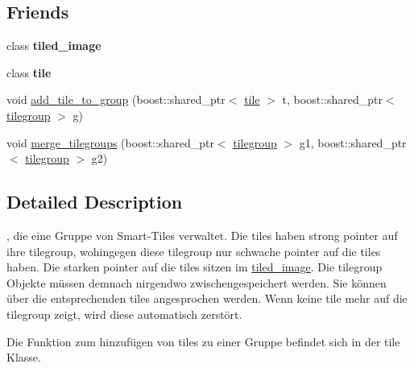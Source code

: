 \subsection*{Friends}
\begin{DoxyCompactItemize}
\item 
\hypertarget{classtilegroup_a82299213a6cc9d5d3fcbdaeb80060be7}{class {\bfseries tiled\-\_\-image}}\label{classtilegroup_a82299213a6cc9d5d3fcbdaeb80060be7}

\item 
\hypertarget{classtilegroup_afc864a305a7251d274bdf2ca681496e4}{class {\bfseries tile}}\label{classtilegroup_afc864a305a7251d274bdf2ca681496e4}

\item 
void \hyperlink{classtilegroup_ad9d048f39dc13c36b83a87295fdf75f9}{add\-\_\-tile\-\_\-to\-\_\-group} (boost\-::shared\-\_\-ptr$<$ \hyperlink{classtile}{tile} $>$ t, boost\-::shared\-\_\-ptr$<$ \hyperlink{classtilegroup}{tilegroup} $>$ g)
\item 
void \hyperlink{classtilegroup_afba0cc66139bf69ca850987161757cd2}{merge\-\_\-tilegroups} (boost\-::shared\-\_\-ptr$<$ \hyperlink{classtilegroup}{tilegroup} $>$ g1, boost\-::shared\-\_\-ptr$<$ \hyperlink{classtilegroup}{tilegroup} $>$ g2)
\end{DoxyCompactItemize}


\subsection{Detailed Description}
, die eine Gruppe von Smart-\/\-Tiles verwaltet. Die tiles haben strong pointer auf ihre tilegroup, wohingegen diese tilegroup nur schwache pointer auf die tiles haben. Die starken pointer auf die tiles sitzen im \hyperlink{classtiled__image}{tiled\-\_\-image}. Die tilegroup Objekte müssen demnach nirgendwo zwischengespeichert werden. Sie können über die entsprechenden tiles angesprochen werden. Wenn keine tile mehr auf die tilegroup zeigt, wird diese automatisch zerstört.

Die Funktion zum hinzufügen von tiles zu einer Gruppe befindet sich in der tile Klasse. 

